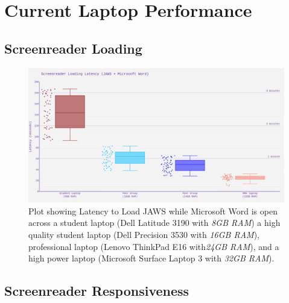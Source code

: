 \documentclass[14pt,letterpaper,twoside]{extreport}
\begin{document}
\pagebreak \hypertarget{current-laptop-performance-measured}{%
	\section{Current Laptop Performance}\label{current-laptop-performance-measured}}
\hypertarget{screenreader-loading}{%
	\subsection{Screenreader Loading}\label{screenreader-loading}}
\begin{figure}[!h]
	\centering
	\includegraphics[width=\textwidth]{images/ComputerRBDisplaySpecsTVIFig1.png}
	\caption[Latency to Load JAWS]{Plot showing Latency to Load JAWS while Microsoft Word is open across a student laptop (Dell Latitude 3190 with \textit{8GB RAM}) a high quality student laptop (Dell Precision 3530 with \textit{16GB RAM}), professional laptop (Lenovo ThinkPad E16 with\textit{24GB RAM}), and a high power laptop (Microsoft Surface Laptop 3 with \textit{32GB RAM}).}
	\label{fig:figure 1}
\end{figure}

\pagebreak
\pagebreak
\hypertarget{screenreader-response}{%
	\subsection{Screenreader Responsiveness}\label{screenreader-response}}
\end{document}
